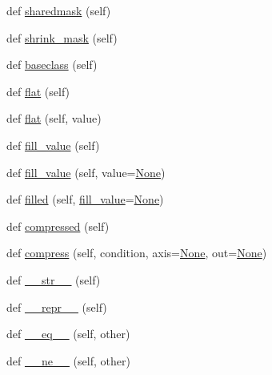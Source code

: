 \begin{DoxyCompactItemize}
\item 
def \hyperlink{classnumpy_1_1ma_1_1core_1_1MaskedArray_a43293babcca606c37a1ad2ef859c62a0}{sharedmask} (self)
\item 
def \hyperlink{classnumpy_1_1ma_1_1core_1_1MaskedArray_abacba5ab475f8271c130d72716b80e53}{shrink\+\_\+mask} (self)
\item 
def \hyperlink{classnumpy_1_1ma_1_1core_1_1MaskedArray_a6acc5bfbe70aa578db2cdaeaccea1c27}{baseclass} (self)
\item 
def \hyperlink{classnumpy_1_1ma_1_1core_1_1MaskedArray_a2f29d009ef7274dd5e3e471454cbd017}{flat} (self)
\item 
def \hyperlink{classnumpy_1_1ma_1_1core_1_1MaskedArray_ac45f9a7b01f28159a21556ea985d2681}{flat} (self, value)
\item 
def \hyperlink{classnumpy_1_1ma_1_1core_1_1MaskedArray_ace3dd24102be9ee3c0fab87dab2f0e36}{fill\+\_\+value} (self)
\item 
def \hyperlink{classnumpy_1_1ma_1_1core_1_1MaskedArray_a17e4b5d6910eba285cc0f3af1eab142a}{fill\+\_\+value} (self, value=\hyperlink{namespacenumpy_1_1ma_1_1core_a647ee1848dfa3692fe35a663a2aa40b3}{None})
\item 
def \hyperlink{classnumpy_1_1ma_1_1core_1_1MaskedArray_ab7e6debaf70a8aa696a53a4498bb9b14}{filled} (self, \hyperlink{classnumpy_1_1ma_1_1core_1_1MaskedArray_a4163711b2717238c0493739e3afea1bd}{fill\+\_\+value}=\hyperlink{namespacenumpy_1_1ma_1_1core_a647ee1848dfa3692fe35a663a2aa40b3}{None})
\item 
def \hyperlink{classnumpy_1_1ma_1_1core_1_1MaskedArray_acef5d8be7f992cbcb451deaeaf3408a7}{compressed} (self)
\item 
def \hyperlink{classnumpy_1_1ma_1_1core_1_1MaskedArray_aad6091c0fb1586c8d7510a37e50d3e72}{compress} (self, condition, axis=\hyperlink{namespacenumpy_1_1ma_1_1core_a647ee1848dfa3692fe35a663a2aa40b3}{None}, out=\hyperlink{namespacenumpy_1_1ma_1_1core_a647ee1848dfa3692fe35a663a2aa40b3}{None})
\item 
def \hyperlink{classnumpy_1_1ma_1_1core_1_1MaskedArray_af5b0203cddbc8da8f49ad2bcd486dc51}{\+\_\+\+\_\+str\+\_\+\+\_\+} (self)
\item 
def \hyperlink{classnumpy_1_1ma_1_1core_1_1MaskedArray_a3d0485420e6f387a657d5fc5f4612701}{\+\_\+\+\_\+repr\+\_\+\+\_\+} (self)
\item 
def \hyperlink{classnumpy_1_1ma_1_1core_1_1MaskedArray_aa1c7b8f18c093729f27ed989af6f26c1}{\+\_\+\+\_\+eq\+\_\+\+\_\+} (self, other)
\item 
def \hyperlink{classnumpy_1_1ma_1_1core_1_1MaskedArray_af550d47e1d4fe284cf74fe3b182cdad1}{\+\_\+\+\_\+ne\+\_\+\+\_\+} (self, other)

\end{DoxyCompactItemize}
